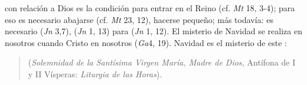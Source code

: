 	  con relación a Dios es la condición para entrar en el Reino (cf. \emph{Mt} 18, 3-4); para eso es necesario abajarse (cf. \emph{Mt} 23, 12), hacerse pequeño; más todavía: es necesario  (\emph{Jn} 3,7),  (\emph{Jn} 1, 13) para  (\emph{Jn} 1, 12). El misterio de Navidad se realiza en nosotros cuando Cristo  en nosotros (\emph{Ga}4, 19). Navidad es el misterio de este :
	
	\begin{quote}
		 (\emph{Solemnidad de la Santísima Virgen María, Madre de Dios,} Antífona de I y II Vísperas: \emph{Liturgia de las Horas}).
	\end{quote}
